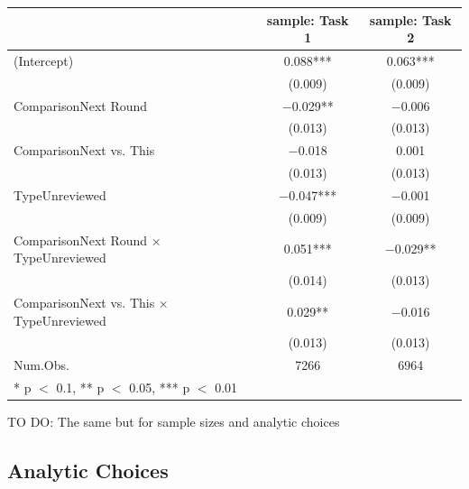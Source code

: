\documentclass[
  letterpaper,
  DIV=11,
  numbers=noendperiod]{scrartcl}
\begin{document}
\begin{table}
\centering
\begin{tabular}[t]{lcc}
\toprule
  & sample: Task 1 & sample: Task 2\\
\midrule

(Intercept) & \num{0.088}*** & \num{0.063}***\\
 & (\num{0.009}) & \vphantom{1} (\num{0.009})\\
ComparisonNext Round & \num{-0.029}** & \num{-0.006}\\
 & (\num{0.013}) & \vphantom{2} (\num{0.013})\\
ComparisonNext vs. This & \num{-0.018} & \num{0.001}\\
 & (\num{0.013}) & \vphantom{1} (\num{0.013})\\
TypeUnreviewed & \num{-0.047}*** & \num{-0.001}\\
 & (\num{0.009}) & (\num{0.009})\\
ComparisonNext Round × TypeUnreviewed & \num{0.051}*** & \num{-0.029}**\\
 & (\num{0.014}) & (\num{0.013})\\
ComparisonNext vs. This × TypeUnreviewed & \num{0.029}** & \num{-0.016}\\
 & (\num{0.013}) & (\num{0.013})\\
\midrule
Num.Obs. & \num{7266} & \num{6964}\\

\bottomrule
\multicolumn{3}{l}{\rule{0pt}{1em}* p $<$ 0.1, ** p $<$ 0.05, *** p $<$ 0.01}\\
\end{tabular}
\end{table}

TO DO: The same but for sample sizes and analytic choices

\hypertarget{analytic-choices}{%
\subsection{Analytic Choices}\label{analytic-choices}}
\end{document}
